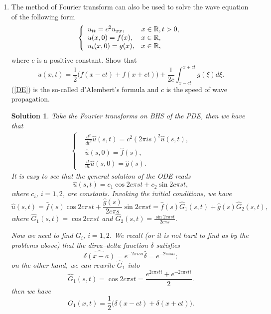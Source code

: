 \documentclass[6pt]{article}
\newtheorem{solution}{Solution}
\numberwithin{equation}{section}
\def\mathbb{\Bbb}
\begin{document}
\begin{enumerate}
\item The method of Fourier transform can also be used to solve the wave equation of the following form
\[
\left\{
\begin{array}{ll}
u_{tt}=c^2u_{xx},&x\in \mathbb R,t>0,\\
u(x,0)=f(x),&x\in \mathbb R,\\
u_t(x,0)=g(x),&x\in \mathbb R,
\end{array}
\right.
\]
where $c$ is a positive constant.  Show that
\begin{equation}\label{DE}
u(x,t)=\frac{1}{2}\Big(f(x-ct)+f(x+ct)\Big)+\frac{1}{2c}\int_{x-ct}
^{x+ct} g(\xi)d\xi.
\end{equation}
(\ref{DE}) is the so-called d'Alembert's formula and $c$ is the speed of wave propagation.
\begin{solution}
Take the Fourier transforms on BHS of the PDE, then we have that
\begin{align*}
\begin{cases}
&\frac{d^2}{dt^2}\hat{u}(s,t)=c^2(2\pi is)^2\hat{u}(s,t),\\
&\hat{u}(s,0)=\hat{f}(s),\\
&\frac{d}{dt}\hat{u}(s,0)=\hat{g}(s).
\end{cases}
\end{align*}
It is easy to see that the general solution of the ODE reads
\[\hat{u}(s,t)=c_1\cos{2c\pi st}+c_2\sin{2c\pi st},\]
where $c_i$, $i=1,2$, are constants.  Invoking the initial conditions, we have
\[\hat{u}(s,t)=\hat{f}(s)\cos{2c\pi st}+\frac{\hat{g}(s)}{2c\pi s}\sin{2c\pi st}=\hat{f}(s)\hat{G}_1(s,t)+\hat{g}(s)\hat{G}_2(s,t),\]
where $\hat{G}_1(s,t)=\cos{2c\pi st}$ and $\hat{G}_2(s,t)=\frac{\sin{2c\pi st}}{2c\pi s}$.

Now we need to find $G_i$, $i=1,2$.  We recall (or it is not hard to find as by the problems above) that the dirca--delta function $\delta$ satisfies
\[\widehat{\delta(x-a)}=e^{-2\pi isa}\hat{\delta}=e^{-2\pi isa};\]
on the other hand, we can rewrite $\hat{G}_1$ into
\[\hat{G}_1 (s,t)=\cos{2c\pi st}=\frac{e^{2c\pi sti}+e^{-2c\pi sti}}{2}.\]
then we have
\[G_1(x,t)=\frac{1}{2}\Big(\delta(x-ct)+\delta(x+ct)\Big).\]


\end{solution}
\end{enumerate}
\end{document}

